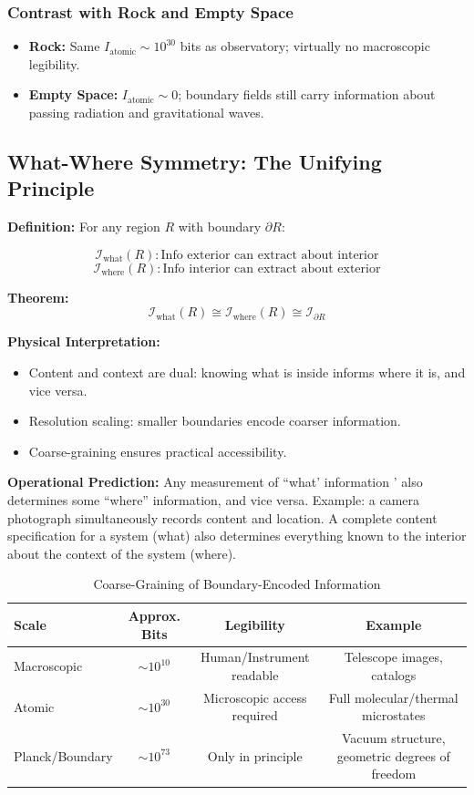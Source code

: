 ﻿\documentclass[12pt]{article}
\begin{document}
\subsubsection{Contrast with Rock and Empty Space}


\begin{itemize}
  \item \textbf{Rock:} Same $I_\mathrm{atomic} \sim 10^{30}$ bits as observatory; virtually no macroscopic legibility.
  \item \textbf{Empty Space:} $I_\mathrm{atomic} \sim 0$; boundary fields still carry information about passing radiation and gravitational waves.
\end{itemize}


\subsection{What-Where Symmetry: The Unifying Principle}


\textbf{Definition:} For any region $R$ with boundary $\partial R$:


\[
\mathcal{I}_\mathrm{what}(R) : \text{Info exterior can extract about interior}
\]
\[
\mathcal{I}_\mathrm{where}(R) : \text{Info interior can extract about exterior}
\]


\textbf{Theorem:} 
\[
\mathcal{I}_\mathrm{what}(R) \cong \mathcal{I}_\mathrm{where}(R) \cong \mathcal{I}_{\partial R}
\]


\textbf{Physical Interpretation:}


\begin{itemize}
  \item Content and context are dual: knowing what is inside informs where it is, and vice versa.
  \item Resolution scaling: smaller boundaries encode coarser information.
  \item Coarse-graining ensures practical accessibility.
\end{itemize}


\textbf{Operational Prediction:} Any measurement of ``what' information ' also determines some ``where'' information, and vice versa. Example: a camera photograph simultaneously records content and location.  A complete content specification for a system (what) also determines everything known to the interior about the context of the system (where).

\begin{table}[h]
\centering
\caption{Coarse-Graining of Boundary-Encoded Information}
\begin{tabular}{|l|c|c|c|}
\hline
\textbf{Scale} & \textbf{Approx. Bits} & \textbf{Legibility} & \textbf{Example} \\
\hline
Macroscopic & $\sim 10^{10}$ & Human/Instrument readable & Telescope images, catalogs \\
Atomic & $\sim 10^{30}$ & Microscopic access required & Full molecular/thermal microstates \\
Planck/Boundary & $\sim 10^{73}$ & Only in principle & Vacuum structure, geometric degrees of freedom \\
\hline
\end{tabular}
\label{tab:coarse_grain}
\end{table}
\end{document}
